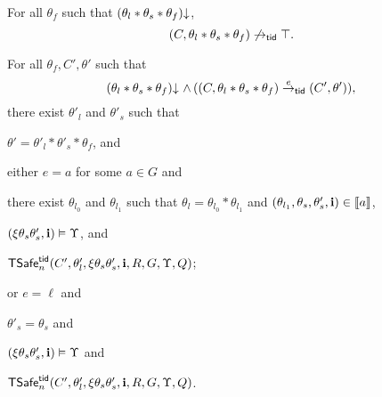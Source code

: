 \begin{defin}
\begin{compactenum}[(a)]
    \item \label{safe:noabort}  
    For all $\theta_f$ such that $(\theta_l*\theta_s*\theta_f)\mathpunct{\downarrow}$,
    $$
    (C,\theta_l*\theta_s*\theta_f) \not\rightarrow_{\sf tid} \top.
    $$
    \item \label{safe:step} 
    For all $\theta_f,C',\theta'$ such that 
    $$
    (\theta_l*\theta_s*\theta_f)\mathpunct{\downarrow}
    \,\wedge\,
    ((C,\theta_l*\theta_s*\theta_f) \stackrel{e}{\rightarrow}_{\sf tid} (C',\theta')),
    $$
    there exist  $\theta'_l$ and $\theta'_s$   such that 
    \begin{compactenum}[(1)]
      \item \label{safe:step:consistent} 
      $\theta'=\theta'_l * \theta'_s * \theta_f$, and 
      \item \label{safe:step:shared}
      either $e = a$ for some $a \in G$ and %
      \begin{compactenum}[(i)]
        \item \label{safe:step:guarantee} 
        there exist $\theta_{l_0}$ and $\theta_{l_1}$  such that
        $\theta_l = \theta_{l_0} * \theta_{l_1}$ 
        and
        $(\theta_{l_1},\theta_s,\theta'_s,{\bf i}) \in \llbracket a \rrbracket$, %
        \item \label{safe:step:inv} 
        $(\xi\theta_s\theta'_s,{\bf i})\vDash\Upsilon$, and  
        \item \label{safe:step:ind} 
        ${\sf TSafe}^{{\sf tid}}_{n}(C',\theta'_l,\xi\theta_s\theta'_s,{\bf i},R,G,\Upsilon,Q)$;      
      \end{compactenum}
      \item  \label{safe:step:stutter}
       or $e = \ell$ and %
      \begin{compactenum}[(i)]
        \item \label{safe:step:stutter:same} 
        $\theta'_s = \theta_s$ and 
        \item \label{safe:step:stutter:inv} 
        $(\xi\theta_s\theta'_s,{\bf i})\vDash\Upsilon$  and 
       \item \label{safe:step:stutter:ind} 
        ${\sf TSafe}^{{\sf tid}}_{n}(C',\theta'_l,\xi\theta_s\theta_s',{\bf i},R,G,\Upsilon,Q)$.
      \end{compactenum}

    \end{compactenum}


\end{compactenum}
\end{defin}
